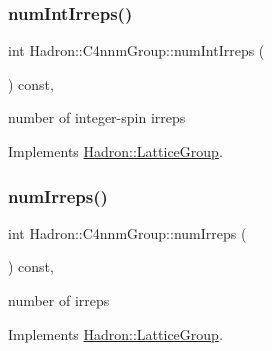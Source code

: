 \mbox{\label{structHadron_1_1C4nnmGroup_afc1f011462142b5aa3ddab6e5824d365}} 
\subsubsection{\texorpdfstring{numIntIrreps()}{numIntIrreps()}\hspace{0.1cm}{\footnotesize\ttfamily [2/2]}}
{\footnotesize\ttfamily int Hadron\+::\+C4nnm\+Group\+::num\+Int\+Irreps (\begin{DoxyParamCaption}{ }\end{DoxyParamCaption}) const\hspace{0.3cm}{\ttfamily [inline]}, {\ttfamily [virtual]}}

number of integer-\/spin irreps 

Implements \mbox{\hyperlink{structHadron_1_1LatticeGroup_af2aa7b39222bf188389356eefcef7547}{Hadron\+::\+Lattice\+Group}}.

\mbox{\label{structHadron_1_1C4nnmGroup_a70b7d429c62a7f1b2ed77cbc3566ea42}} 
\subsubsection{\texorpdfstring{numIrreps()}{numIrreps()}\hspace{0.1cm}{\footnotesize\ttfamily [1/2]}}
{\footnotesize\ttfamily int Hadron\+::\+C4nnm\+Group\+::num\+Irreps (\begin{DoxyParamCaption}{ }\end{DoxyParamCaption}) const\hspace{0.3cm}{\ttfamily [inline]}, {\ttfamily [virtual]}}

number of irreps 

Implements \mbox{\hyperlink{structHadron_1_1LatticeGroup_a3edaca488144b5d2a9cf73fe653add34}{Hadron\+::\+Lattice\+Group}}.

\mbox{\label{structHadron_1_1C4nnmGroup_a70b7d429c62a7f1b2ed77cbc3566ea42}} 
